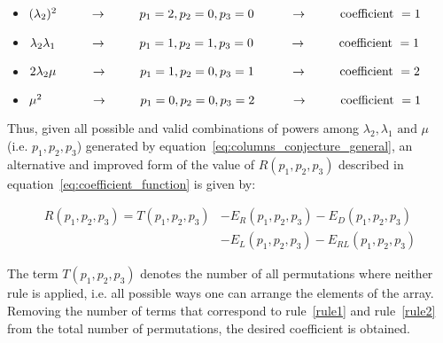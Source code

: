 \begin{itemize}
    \item \((\lambda_2)^2 \hspace{0.9cm} \rightarrow \hspace{0.9cm}
    p_1 = 2, p_2=0, p_3=0 \hspace{1cm} \rightarrow \hspace{0.9cm}
    \text{coefficient } = 1\)
    \item \(\lambda_2 \lambda_1 \hspace{0.95cm} \rightarrow \hspace{0.9cm}
    p_1 = 1, p_2=1, p_3=0 \hspace{1cm} \rightarrow \hspace{0.9cm}
    \text{coefficient } = 1\)
    \item \(2 \lambda_2 \mu \hspace{0.95cm} \rightarrow \hspace{0.9cm}
     p_1 = 1, p_2=0, p_3=1 \hspace{1cm} \rightarrow \hspace{0.9cm}
     \text{coefficient } = 2\)
    \item \(\mu^2 \hspace{1.35cm} \rightarrow \hspace{0.9cm}
    p_1=0, p_2=0, p_3=2 \hspace{1cm} \rightarrow \hspace{0.9cm}
    \text{coefficient } = 1\)
\end{itemize}

Thus, given all possible and valid combinations of powers among \(\lambda_2,
\lambda_1 \text{ and } \mu\) (i.e. \(p_1,p_2,p_3\)) generated by
equation~\eqref{eq:columns_conjecture_general}, an alternative and improved form
of the value of \(R(p_1, p_2, p_3)\) described in
equation~\eqref{eq:coefficient_function} is given by:

\begin{align}\label{eq:permutation formula}
    R(p_1, p_2, p_3) = T(p_1, p_2, p_3) & - E_R(p_1, p_2, p_3)
    - E_D(p_1, p_2, p_3) \nonumber \\
    & - E_L(p_1, p_2, p_3) - E_{RL}(p_1, p_2, p_3)
\end{align}


The term \(T(p_1,p_2,p_3)\) denotes the number of all permutations where neither
rule is applied, i.e. all possible ways one can arrange the elements of the
array.
Removing the number of terms that correspond to rule~\ref{rule1} and
rule~\ref{rule2} from the total number of permutations, the desired
coefficient is obtained.

